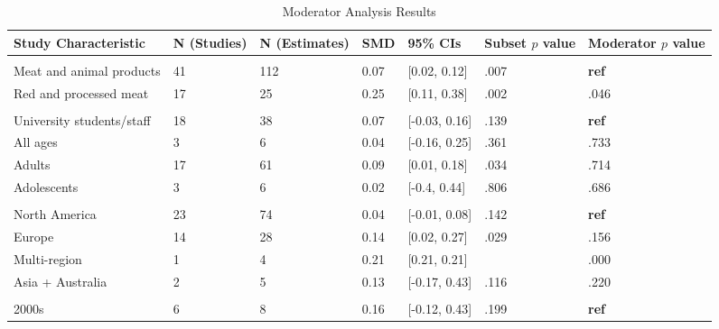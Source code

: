 \documentclass[sn-nature,referee,pdflatex]{sn-jnl}
\begin{document}
\begin{table}[!ht]

\caption{\label{tab:table_S1}Moderator Analysis Results}
\begin{tabular}[t]{lllll>{\raggedright\arraybackslash}p{2 cm}>{\raggedright\arraybackslash}p{2 cm}}
\toprule
Study Characteristic & N (Studies) & N (Estimates) & SMD & 95\% CIs & Subset $p$ value & Moderator $p$ value\\
\midrule
\addlinespace[0.3em]
\multicolumn{7}{l}{\textbf{Outcome}}\\
\hspace{1em}Meat and animal products & 41 & 112 & 0.07 & {}[0.02, 0.12] & .007 & \textbf{ref}\\
\hspace{1em}Red and processed meat & 17 & 25 & 0.25 & {}[0.11, 0.38] & .002 & .046\\
\addlinespace[0.3em]
\multicolumn{7}{l}{\textbf{Population}}\\
\hspace{1em}University students/staff & 18 & 38 & 0.07 & {}[-0.03, 0.16] & .139 & \textbf{ref}\\
\hspace{1em}All ages & 3 & 6 & 0.04 & {}[-0.16, 0.25] & .361 & .733\\
\hspace{1em}Adults & 17 & 61 & 0.09 & {}[0.01, 0.18] & .034 & .714\\
\hspace{1em}Adolescents & 3 & 6 & 0.02 & {}[-0.4, 0.44] & .806 & .686\\
\addlinespace[0.3em]
\multicolumn{7}{l}{\textbf{Region}}\\
\hspace{1em}North America & 23 & 74 & 0.04 & {}[-0.01, 0.08] & .142 & \textbf{ref}\\
\hspace{1em}Europe & 14 & 28 & 0.14 & {}[0.02, 0.27] & .029 & .156\\
\hspace{1em}Multi-region & 1 & 4 & 0.21 & {}[0.21, 0.21] & 0 & .000\\
\hspace{1em}Asia + Australia & 2 & 5 & 0.13 & {}[-0.17, 0.43] & .116 & .220\\
\addlinespace[0.3em]
\multicolumn{7}{l}{\textbf{Publication Decade}}\\
\hspace{1em}2000s & 6 & 8 & 0.16 & {}[-0.12, 0.43] & .199 & \textbf{ref}\\

\end{tabular}
\end{table}
\end{document}
